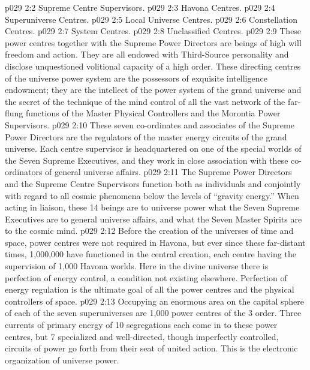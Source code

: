 \vs p029 2:2 \bibnobreakspace Supreme Centre Supervisors.
\vs p029 2:3 \bibnobreakspace Havona Centres.
\vs p029 2:4 \bibnobreakspace Superuniverse Centres.
\vs p029 2:5 \bibnobreakspace Local Universe Centres.
\vs p029 2:6 \bibnobreakspace Constellation Centres.
\vs p029 2:7 \bibnobreakspace System Centres.
\vs p029 2:8 \bibnobreakspace Unclassified Centres.
\vs p029 2:9 \pc These power centres together with the Supreme Power Directors are beings of high will freedom and action. They are all endowed with Third\hyp{}Source personality and disclose unquestioned volitional capacity of a high order. These directing centres of the universe power system are the possessors of exquisite intelligence endowment; they are the intellect of the power system of the grand universe and the secret of the technique of the mind control of all the vast network of the far\hyp{}flung functions of the Master Physical Controllers and the Morontia Power Supervisors.
\vs p029 2:10 \bibnobreakspace {} These seven co\hyp{}ordinates and associates of the Supreme Power Directors are the regulators of the master energy circuits of the grand universe. Each centre supervisor is headquartered on one of the special worlds of the Seven Supreme Executives, and they work in close association with these co\hyp{}ordinators of general universe affairs.
\vs p029 2:11 The Supreme Power Directors and the Supreme Centre Supervisors function both as individuals and conjointly with regard to all cosmic phenomena below the levels of “gravity energy.” When acting in liaison, these 14 beings are to universe power what the Seven Supreme Executives are to general universe affairs, and what the Seven Master Spirits are to the cosmic mind.
\vs p029 2:12 \bibnobreakspace {} Before the creation of the universes of time and space, power centres were not required in Havona, but ever since these far\hyp{}distant times, 1,000,000 have functioned in the central creation, each centre having the supervision of 1,000 Havona worlds. Here in the divine universe there is perfection of energy control, a condition not existing elsewhere. Perfection of energy regulation is the ultimate goal of all the power centres and the physical controllers of space.
\vs p029 2:13 \bibnobreakspace {} Occupying an enormous area on the capital sphere of each of the seven superuniverses are 1,000 power centres of the 3 order. Three currents of primary energy of 10 segregations each come in to these power centres, but 7 specialized and well\hyp{}directed, though imperfectly controlled, circuits of power go forth from their seat of united action. This is the electronic organization of universe power.
